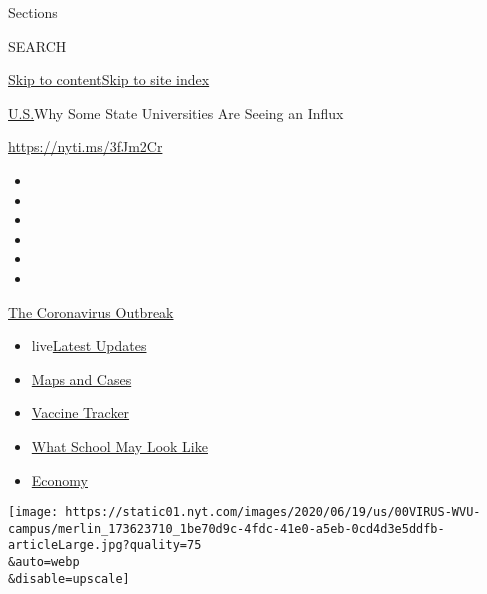 Sections

SEARCH

\protect\hyperlink{site-content}{Skip to
content}\protect\hyperlink{site-index}{Skip to site index}

\href{/section/us}{U.S.}\textbar{}Why Some State Universities Are Seeing
an Influx

\url{https://nyti.ms/3fJm2Cr}

\begin{itemize}
\item
\item
\item
\item
\item
\item
\end{itemize}

\href{https://www.nytimes.com/news-event/coronavirus?action=click\&pgtype=Article\&state=default\&region=TOP_BANNER\&context=storylines_menu}{The
Coronavirus Outbreak}

\begin{itemize}
\tightlist
\item
  live\href{https://www.nytimes.com/2020/08/02/world/coronavirus-updates.html?action=click\&pgtype=Article\&state=default\&region=TOP_BANNER\&context=storylines_menu}{Latest
  Updates}
\item
  \href{https://www.nytimes.com/interactive/2020/us/coronavirus-us-cases.html?action=click\&pgtype=Article\&state=default\&region=TOP_BANNER\&context=storylines_menu}{Maps
  and Cases}
\item
  \href{https://www.nytimes.com/interactive/2020/science/coronavirus-vaccine-tracker.html?action=click\&pgtype=Article\&state=default\&region=TOP_BANNER\&context=storylines_menu}{Vaccine
  Tracker}
\item
  \href{https://www.nytimes.com/interactive/2020/07/29/us/schools-reopening-coronavirus.html?action=click\&pgtype=Article\&state=default\&region=TOP_BANNER\&context=storylines_menu}{What
  School May Look Like}
\item
  \href{https://www.nytimes.com/live/2020/07/31/business/stock-market-today-coronavirus?action=click\&pgtype=Article\&state=default\&region=TOP_BANNER\&context=storylines_menu}{Economy}
\end{itemize}

\texttt{[image: https://static01.nyt.com/images/2020/06/19/us/00VIRUS-WVU-campus/merlin\_173623710\_1be70d9c-4fdc-41e0-a5eb-0cd4d3e5ddfb-articleLarge.jpg?quality=75\\\&auto=webp\\\&disable=upscale]}

